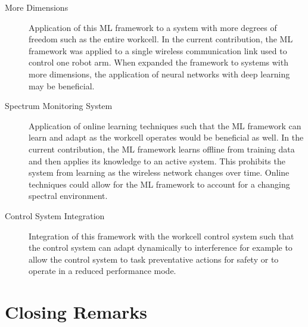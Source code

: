 \begin{description}
	
	\item[More Dimensions] Application of this ML framework to a system with more degrees of freedom such as the entire workcell.  In the current contribution, the ML framework was applied to a single wireless communication link used to control one robot arm.  When expanded the framework to systems with more dimensions, the application of neural networks with deep learning may be beneficial.
	
	\item[Spectrum Monitoring System] Application of online learning techniques such that the ML framework can learn and adapt as the workcell operates would be beneficial as well.  In the current contribution, the ML framework learns offline from training data and then applies its knowledge to an active system.  This prohibits the system from learning as the wireless network changes over time.  Online techniques could allow for the ML framework to account for a changing spectral environment.
	
	\item[Control System Integration] Integration of this framework with the workcell control system such that the control system can adapt dynamically to interference for example to allow the control system to task preventative actions for safety or to operate in a reduced performance mode.
	
\end{description}

\section{Closing Remarks}

